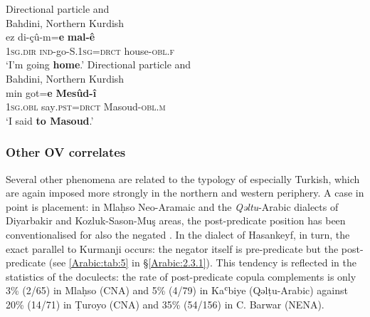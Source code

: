 \documentclass[output=paper,colorlinks,citecolor=brown,draftmode]{langscibook}
\begin{document}
\newpage
\ea
\ea\label{Arabic:ex:49a}
Directional particle and \\
Bahdini, Northern Kurdish\\
\gll ez di-çû-m=\textbf{e} \textbf{mal-ê} \\
\textsc{1sg.dir} \textsc{ind-}go\textsc{-S.1sg=drct} house\textsc{-obl.f} \\
\glt `I'm going \textbf{home}.'
\ex\label{Arabic:ex:49b}
Directional particle and \\
Bahdini, Northern Kurdish\\
\gll min got=\textbf{e} \textbf{Mesûd-î} \\
\textsc{1sg.obl} say\textsc{.pst=drct} Masoud\textsc{-obl.m} \\
\glt `I said \textbf{to Masoud}.'
\z
\z

\subsubsection{Other OV correlates}

Several other phenomena are related to the  typology of especially Turkish, which are again imposed more strongly in the northern and western periphery. A case in point is  placement: in Mlaḥso Neo-Aramaic and the \textit{Qəltu}-Arabic dialects of Diyarbakir and Kozluk-Sason-Muş areas, the post-predicate position has been conventionalised for also the negated . In the dialect of Hasankeyf, in turn, the exact parallel to Kurmanji occurs: the negator itself is pre-predicate but the  post-predicate (see \ref{Arabic:tab:5} in §\ref{Arabic:2.3.1}). This tendency is reflected in the statistics of the doculects: the rate of post-predicate copula complements is only 3\% (2/65) in Mlaḥso (CNA) and 5\% (4/79) in Kaʿbiye (Qəlṭu-Arabic) against 20\% (14/71) in Ṭuroyo (CNA) and 35\% (54/156) in C. Barwar (NENA).
\end{document}
